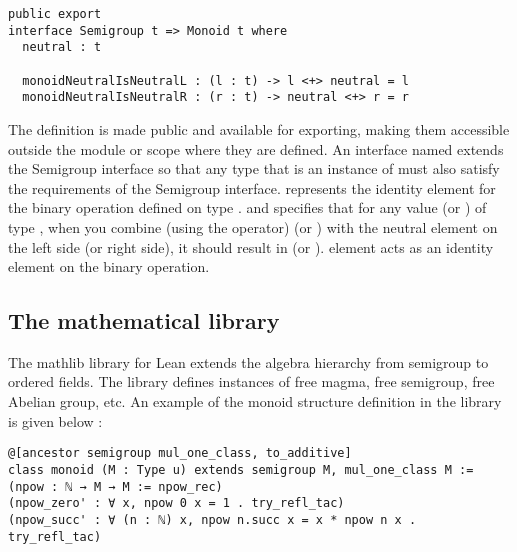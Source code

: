 \begin{verbatim}
public export
interface Semigroup t => Monoid t where
  neutral : t

  monoidNeutralIsNeutralL : (l : t) -> l <+> neutral = l
  monoidNeutralIsNeutralR : (r : t) -> neutral <+> r = r
\end{verbatim}

The definition is made public and available for exporting, making them
accessible outside the module or scope where they are defined. An interface
named  extends the Semigroup interface so that any
type  that is an instance of  must also
satisfy the requirements of the Semigroup interface. 
represents the identity element for the binary operation defined on type
.  and
 specifies that for any value
 (or ) of type , when you combine (using the
\inline{<+>} operator)  (or ) with the neutral element on
the left side (or right side), it should result in  (or ).
 element acts as an identity element on the binary operation.

\subsection{The mathematical library}

The mathlib library for Lean extends the algebra hierarchy from semigroup to
ordered fields. The library defines instances of free magma, free semigroup,
free Abelian group, etc. An example of the monoid structure definition in the
library is given below \cite{baanen2022use}: 

\begin{verbatim}
@[ancestor semigroup mul_one_class, to_additive]
class monoid (M : Type u) extends semigroup M, mul_one_class M :=
(npow : ℕ → M → M := npow_rec)
(npow_zero' : ∀ x, npow 0 x = 1 . try_refl_tac)
(npow_succ' : ∀ (n : ℕ) x, npow n.succ x = x * npow n x . try_refl_tac)
\end{verbatim}

